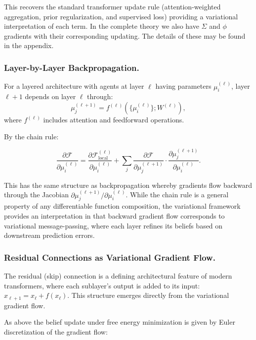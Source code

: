 \documentclass[twoside,11pt]{article}
\begin{document}
This recovers the standard transformer update rule (attention-weighted aggregation, prior regularization, and supervised loss) providing a variational interpretation of each term.  In the complete theory we also have $\Sigma$ and $\phi$ gradients with their corresponding updating.  The details of these may be found in the appendix.

\subsubsection{Layer-by-Layer Backpropagation.}

For a layered architecture with agents at layer $\ell$ having parameters $\mu_i^{(\ell)}$, layer $\ell+1$ depends on layer $\ell$ through:
\begin{equation}
\mu_j^{(\ell+1)} = f^{(\ell)}(\{\mu_i^{(\ell)}\}; W^{(\ell)}),
\end{equation}
where $f^{(\ell)}$ includes attention and feedforward operations.

By the chain rule:

\begin{equation}
\frac{\partial \mathcal{F}}{\partial \mu_i^{(\ell)}} = \frac{\partial \mathcal{F}_{\text{local}}^{(\ell)}}{\partial \mu_i^{(\ell)}} + \sum_j \frac{\partial \mathcal{F}}{\partial \mu_j^{(\ell+1)}} \cdot \frac{\partial \mu_j^{(\ell+1)}}{\partial \mu_i^{(\ell)}}.
\end{equation}

This has the same structure as backpropagation whereby gradients flow backward through the Jacobian $\partial \mu_j^{(\ell+1)}/\partial \mu_i^{(\ell)}$. While the chain rule is a general property of any differentiable function composition, the variational framework provides an interpretation in that backward gradient flow corresponds to variational message-passing, where each layer refines its beliefs based on downstream prediction errors.

\subsubsection{Residual Connections as Variational Gradient Flow.}
\label{sec:residual_connections}

The residual (skip) connection is a defining architectural feature of modern transformers, where each sublayer's output is added to its input: $x_{\ell+1} = x_\ell + f(x_\ell)$. This structure emerges directly from the variational gradient flow.

As above the belief update under free energy minimization is given by Euler discretization of the gradient flow:
\end{document}
